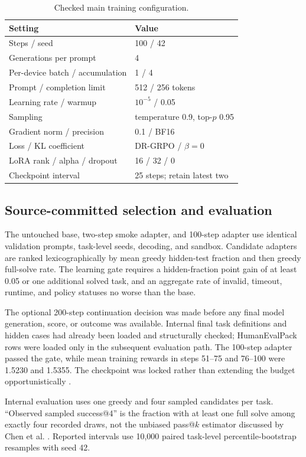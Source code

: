 \documentclass[11pt]{article}
\begin{document}
\begin{table}[ht]
\centering
\caption{Checked main training configuration.}
\label{tab:training}
\begin{tabular}{@{}ll@{}}
\toprule
Setting & Value \\
\midrule
Steps / seed & 100 / 42 \\
Generations per prompt & 4 \\
Per-device batch / accumulation & 1 / 4 \\
Prompt / completion limit & 512 / 256 tokens \\
Learning rate / warmup & $10^{-5}$ / 0.05 \\
Sampling & temperature 0.9, top-$p$ 0.95 \\
Gradient norm / precision & 0.1 / BF16 \\
Loss / KL coefficient & DR-GRPO / $\beta=0$ \\
LoRA rank / alpha / dropout & 16 / 32 / 0 \\
Checkpoint interval & 25 steps; retain latest two \\
\bottomrule
\end{tabular}
\end{table}

\subsection{Source-committed selection and evaluation}

The untouched base, two-step smoke adapter, and 100-step adapter use identical validation prompts, task-level seeds, decoding, and sandbox. Candidate adapters are ranked lexicographically by mean greedy hidden-test fraction and then greedy full-solve rate. The learning gate requires a hidden-fraction point gain of at least 0.05 or one additional solved task, and an aggregate rate of invalid, timeout, runtime, and policy statuses no worse than the base.

The optional 200-step continuation decision was made before any final model generation, score, or outcome was available. Internal final task definitions and hidden cases had already been loaded and structurally checked; HumanEvalPack rows were loaded only in the subsequent evaluation path. The 100-step adapter passed the gate, while mean training rewards in steps 51--75 and 76--100 were 1.5230 and 1.5355. The checkpoint was locked rather than extending the budget opportunistically \cite{runsummary}.

Internal evaluation uses one greedy and four sampled candidates per task. ``Observed sampled success@4'' is the fraction with at least one full solve among exactly four recorded draws, not the unbiased pass@$k$ estimator discussed by Chen et al. \cite{codexeval}. Reported intervals use 10,000 paired task-level percentile-bootstrap resamples with seed 42.
\end{document}
